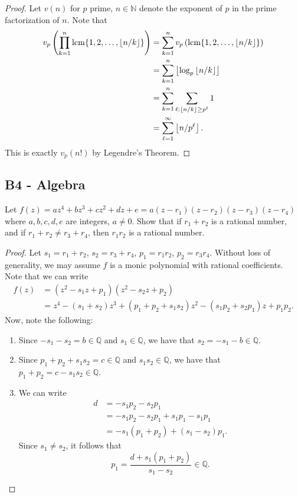 \documentclass[11pt]{scrartcl}
\newcommand{\N}{\mathbb{N}}
\newcommand{\Q}{\mathbb{Q}}
\newcommand{\<}{\langle}
\renewcommand{\>}{\rangle}
\begin{document}
\begin{proof}
Let $v(n)$ for $p$ prime, $n \in \N$ denote the exponent of $p$ in the prime factorization of $n$.  Note that 
\begin{align*}
v_p\left ( \prod_{k=1}^n \operatorname*{lcm} \{1, 2, \dots, \left\lfloor n/k \right\rfloor\}\right) &= \sum_{k=1}^n v_p \left (\operatorname*{lcm}\{1, 2, \dots, \left\lfloor n/k \right\rfloor\} \right) \\
&= \sum_{k=1}^n \left\lfloor \log_p \left\lfloor n/k \right\rfloor \right\rfloor \\
&= \sum_{k=1}^n \sum_{\ell : \left\lfloor n/k \right\rfloor \ge p^\ell} 1 \\
&= \sum_{\ell=1}^\infty \left\lfloor n/p^\ell \right\rfloor.
\end{align*}
This is exactly $v_p(n!)$ by Legendre's Theorem.  
\end{proof}
\pagebreak
\subsection{B4 - Algebra}
Let $f(z) = az^4+ bz^3+ cz^2+ dz + e = a(z -r_1)(z -r_2)(z -r_3)(z -r_4)$ where $a, b, c, d, e$ are integers, $a \not= 0$. Show that if $r_1 + r_2$ is a rational number, and if $r_1 + r_2 \neq r_3 + r_4$, then $r_1r_2$ is a rational number.
\begin{proof}
Let $s_1 = r_1 + r_2$, $s_2 = r_3 + r_4$, $p_1 = r_1r_2$, $p_2 = r_3r_4$.  Without loss of generality, we may assume $f$ is a monic polynomial with rational coefficients.  Note that we can write 
\begin{align*}
f(z) &= (z^2 - s_1z + p_1)(z^2 - s_2 z + p_2) \\
&= z^4 - (s_1 + s_2) z^3 + (p_1 + p_2 + s_1s_2)z^2 - (s_1p_2 + s_2p_1)z + p_1p_2.
\end{align*}
Now, note the following:
\begin{enumerate}
\item Since $-s_1 - s_2 = b \in \Q$ and $s_1 \in \Q$, we have that $s_2 = -s_1 - b \in \Q$.  
\item Since $p_1 + p_2 + s_1s_2 = c \in \Q$ and $s_1s_2 \in \Q$, we have that $p_1 + p_2 = c - s_1s_2 \in \Q$.
\item We can write 
\begin{align*}
d &= -s_1p_2 - s_2p_1 \\
&= -s_1p_2 - s_2p_1 + s_1p_1 - s_1p_1 \\
&= -s_1(p_1 + p_2) + (s_1 - s_2)p_1.
\end{align*}
Since $s_1 \ne s_2$, it follows that 
$$p_1 = \frac{d + s_1(p_1 + p_2)}{s_1 - s_2} \in \Q.$$
\end{enumerate}
\end{proof}
\pagebreak
\end{document}
